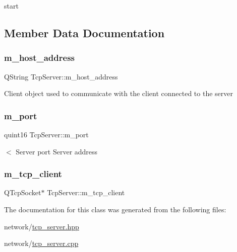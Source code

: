 start 



\subsection{Member Data Documentation}
\mbox{\label{class_tcp_server_aa8fd2e3eebacb69a7f785ffcc2a69eee}} 
\subsubsection{\texorpdfstring{m\_host\_address}{m\_host\_address}}
{\footnotesize\ttfamily Q\+String Tcp\+Server\+::m\+\_\+host\+\_\+address\hspace{0.3cm}{\ttfamily [private]}}

Client object used to communicate with the client connected to the server \mbox{\label{class_tcp_server_a01d5a7bfe29ae6632180be7899d3740f}} 
\subsubsection{\texorpdfstring{m\_port}{m\_port}}
{\footnotesize\ttfamily quint16 Tcp\+Server\+::m\+\_\+port\hspace{0.3cm}{\ttfamily [private]}}

$<$ Server port Server address \mbox{\label{class_tcp_server_a34a159e3301900eac7bf08346fc3615b}} 
\subsubsection{\texorpdfstring{m\_tcp\_client}{m\_tcp\_client}}
{\footnotesize\ttfamily Q\+Tcp\+Socket$\ast$ Tcp\+Server\+::m\+\_\+tcp\+\_\+client\hspace{0.3cm}{\ttfamily [private]}}



The documentation for this class was generated from the following files\+:\begin{DoxyCompactItemize}
\item 
network/\mbox{\hyperlink{tcp__server_8hpp}{tcp\+\_\+server.\+hpp}}\item 
network/\mbox{\hyperlink{tcp__server_8cpp}{tcp\+\_\+server.\+cpp}}\end{DoxyCompactItemize}
